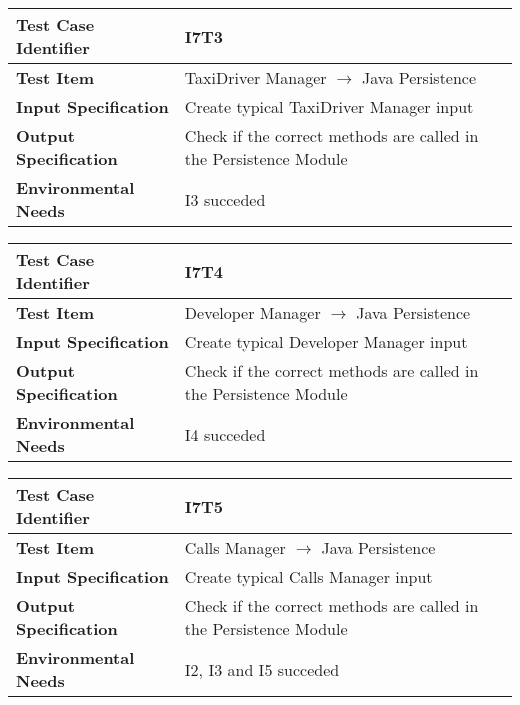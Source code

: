 \begin{table}[!htbp]
\begin{center}
\begin{tabular}[t]{p{}|p{}}

\hline
\textbf{Test Case Identifier} & I7T3 \\
\hline
\textbf{Test Item} & TaxiDriver Manager $\rightarrow$ Java Persistence \\
\hline
\textbf{Input Specification} & Create typical TaxiDriver Manager input \\
\hline
\textbf{Output Specification} & Check if the correct methods are called in the Persistence Module \\
\hline
\textbf{Environmental Needs} & I3 succeded \\
\hline

\end{tabular}
\end{center}
\end{table}

\begin{table}[!htbp]
\begin{center}
\begin{tabular}[t]{p{}|p{}}

\hline
\textbf{Test Case Identifier} & I7T4 \\
\hline
\textbf{Test Item} & Developer Manager $\rightarrow$ Java Persistence \\
\hline
\textbf{Input Specification} & Create typical Developer Manager input \\
\hline
\textbf{Output Specification} & Check if the correct methods are called in the Persistence Module \\
\hline
\textbf{Environmental Needs} & I4 succeded \\
\hline

\end{tabular}
\end{center}
\end{table}

\begin{table}[!htbp]
\begin{center}
\begin{tabular}[t]{p{}|p{}}

\hline
\textbf{Test Case Identifier} & I7T5 \\
\hline
\textbf{Test Item} & Calls Manager $\rightarrow$ Java Persistence \\
\hline
\textbf{Input Specification} & Create typical Calls Manager input \\
\hline
\textbf{Output Specification} & Check if the correct methods are called in the Persistence Module \\
\hline
\textbf{Environmental Needs} & I2, I3 and I5 succeded \\
\hline

\end{tabular}
\end{center}
\end{table}


